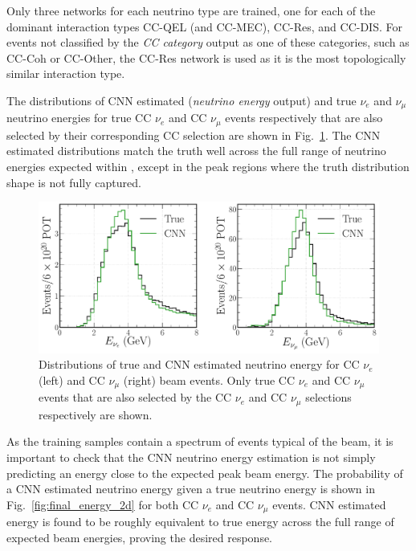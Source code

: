 Only three networks for each neutrino type are trained, one for each of the dominant interaction
types CC-QEL (and CC-MEC), CC-Res, and CC-DIS. For events not classified by the \emph{CC category}
output as one of these categories, such as CC-Coh or CC-Other, the CC-Res network is used as it is
the most topologically similar interaction type.

The distributions of CNN estimated (\emph{neutrino energy} output) and true $\nu_{e}$ and
$\nu_{\mu}$ neutrino energies for true CC $\nu_{e}$ and CC $\nu_{\mu}$ events respectively that
are also selected by their corresponding CC selection are shown in
Fig.~\ref{fig:final_energy_dists}. The CNN estimated distributions match the truth well across the
full range of neutrino energies expected within \chipsfive, except in the peak regions where the
truth distribution shape is not fully captured.

\begin{figure} %
    \includegraphics[width=\textwidth]{diagrams/7-results/final_energy_dists.pdf}
    \caption[Distributions of true and CNN estimated neutrino energy]
    {Distributions of true and CNN estimated neutrino energy for CC $\nu_{e}$ (left) and CC
        $\nu_{\mu}$ (right) beam events. Only true CC $\nu_{e}$ and CC $\nu_{\mu}$ events that are
        also selected by the CC $\nu_{e}$ and CC $\nu_{\mu}$ selections respectively are shown.}
    \label{fig:final_energy_dists}
\end{figure}

As the training samples contain a spectrum of events typical of the beam, it is important to check
that the CNN neutrino energy estimation is not simply predicting an energy close to the expected
peak beam energy. The probability of a CNN estimated neutrino energy given a true neutrino energy
is shown in Fig.~\ref{fig:final_energy_2d} for both CC $\nu_{e}$ and CC $\nu_{\mu}$ events. CNN
estimated energy is found to be roughly equivalent to true energy across the full range of
expected \chipsfive beam energies, proving the desired response.


